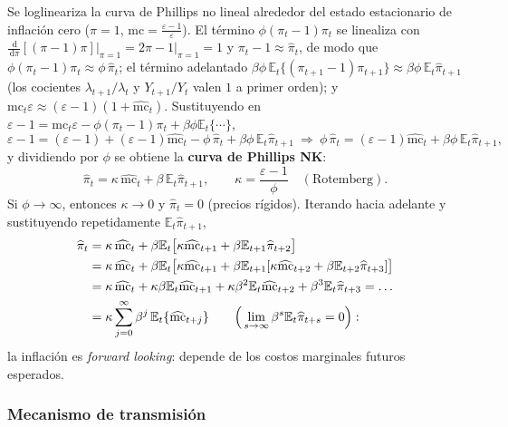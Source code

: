 \documentclass[11pt]{article}
\theoremstyle{definition}
\newcommand{\E}{\mathbb{E}}
\newcommand{\dd}{\,\mathrm{d}}
\newcommand{\mc}{\mathrm{mc}}
\begin{document}
Se loglineariza la curva de Phillips no lineal alrededor del estado estacionario de inflación cero
($\pi=1$, $\mc=\tfrac{\varepsilon-1}{\varepsilon}$). El término $\phi(\pi_{t}-1)\pi_{t}$ se linealiza con
$\tfrac{\dd}{\dd\pi}[(\pi-1)\pi]\big|_{\pi=1}=2\pi-1\big|_{\pi=1}=1$ y $\pi_{t}-1\approx\widehat{\pi}_{t}$,
de modo que $\phi(\pi_{t}-1)\pi_{t}\approx\phi\,\widehat{\pi}_{t}$; el término adelantado
$\beta\phi\,\E_{t}\{(\pi_{t+1}-1)\pi_{t+1}\}\approx\beta\phi\,\E_{t}\widehat{\pi}_{t+1}$ (los cocientes
$\lambda_{t+1}/\lambda_{t}$ y $Y_{t+1}/Y_{t}$ valen $1$ a primer orden); y $\mc_{t}\varepsilon\approx
(\varepsilon-1)(1+\widehat{\mc}_{t})$. Sustituyendo en $\varepsilon-1=\mc_{t}\varepsilon-\phi(\pi_{t}-1)\pi_{t}+\beta\phi\E_{t}\{\cdots\}$,
\begin{equation}
\varepsilon-1=(\varepsilon-1)+(\varepsilon-1)\widehat{\mc}_{t}-\phi\,\widehat{\pi}_{t}+\beta\phi\,\E_{t}\widehat{\pi}_{t+1}
\ \Longrightarrow\
\phi\,\widehat{\pi}_{t}=(\varepsilon-1)\widehat{\mc}_{t}+\beta\phi\,\E_{t}\widehat{\pi}_{t+1},
\end{equation}
y dividiendo por $\phi$ se obtiene la \textbf{curva de Phillips NK}:
\begin{equation}
\widehat{\pi}_{t}=\kappa\,\widehat{\mc}_{t}+\beta\,\E_{t}\widehat{\pi}_{t+1},
\qquad
\kappa=\frac{\varepsilon-1}{\phi}\quad(\text{Rotemberg}).
\end{equation}
Si $\phi\to\infty$, entonces $\kappa\to0$ y $\widehat{\pi}_{t}=0$ (precios rígidos). Iterando hacia
adelante y sustituyendo repetidamente $\E_{t}\widehat{\pi}_{t+1}$,
\begin{align}
\widehat{\pi}_{t}&=\kappa\,\widehat{\mc}_{t}+\beta\E_{t}\big[\kappa\widehat{\mc}_{t+1}+\beta\E_{t+1}\widehat{\pi}_{t+2}\big] \notag\\
&=\kappa\,\widehat{\mc}_{t}+\beta\E_{t}\big[\kappa\widehat{\mc}_{t+1}+\beta\E_{t+1}[\kappa\widehat{\mc}_{t+2}+\beta\E_{t+2}\widehat{\pi}_{t+3}]\big] \notag\\
&=\kappa\,\widehat{\mc}_{t}+\kappa\beta\E_{t}\widehat{\mc}_{t+1}+\kappa\beta^{2}\E_{t}\widehat{\mc}_{t+2}+\beta^{3}\E_{t}\widehat{\pi}_{t+3}
=\dots \notag\\
&=\kappa\sum_{j=0}^{\infty}\beta^{j}\,\E_{t}\{\widehat{\mc}_{t+j}\}
\qquad\Big(\lim_{s\to\infty}\beta^{s}\E_{t}\widehat{\pi}_{t+s}=0\Big):
\end{align}
la inflación es \emph{forward looking}: depende de los costos marginales futuros esperados.

\subsubsection{Mecanismo de transmisión}
\end{document}
